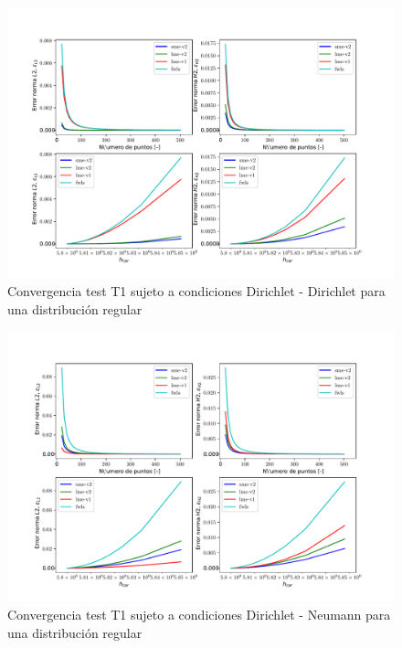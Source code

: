 \begin{figure}
    \centering
    \includegraphics[width=1\textwidth]{./Imagenes/06/comparacion_shp_regular/T1_regular_type-2_caso-1_direct_dgesv-lapack-blas_sme-v2_lme-v2_lme-v1_fwls.pdf}
    \caption{Convergencia test T1 sujeto a condiciones Dirichlet - Dirichlet para una distribución regular} \label{fig:T1_caso-1_conv}
\end{figure}
\begin{figure}
    \centering
    \includegraphics[width=1\textwidth]{./Imagenes/06/comparacion_shp_regular/T1_regular_type-2_caso-2_direct_dgesv-lapack-blas_sme-v2_lme-v2_lme-v1_fwls.pdf}
    \caption{Convergencia test T1 sujeto a condiciones Dirichlet - Neumann para una distribución regular} \label{fig:T1_caso-2_conv}
\end{figure}
